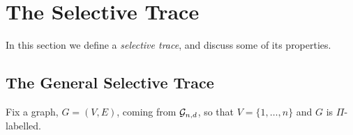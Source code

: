 \documentclass[12pt]{article}
\newcommand{\cg}{{\cal G}}
\newcommand{\cgnd}{\cg_{n,d}}
\newcommand{\ird}[1]{{\rm Irred}_{#1}}
\begin{document}
\section{The Selective Trace}

In this section we define a {\em selective trace}, and discuss some of
its properties.  


\subsection{The General Selective Trace}

Fix a graph, $G=(V,E)$, coming from $\cgnd$, so that $V=\{1,\ldots,n\}$
and $G$ is $\Pi$-labelled.
\end{document}
